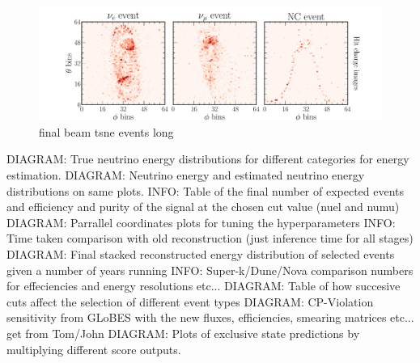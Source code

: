 \begin{figure} %
    \includegraphics[width=\textwidth]{diagrams/6-cvn/chipsnet/final_beam_tsne_events.pdf}
    \caption[final beam tsne events short]
    {final beam tsne events long}
    \label{fig:final_beam_tsne_events}
\end{figure} %

DIAGRAM: True neutrino energy distributions for different categories for energy estimation.
DIAGRAM: Neutrino energy and estimated neutrino energy distributions on same plots.
INFO: Table of the final number of expected events and efficiency and purity of the signal at the chosen cut value (nuel and numu)
DIAGRAM: Parrallel coordinates plots for tuning the hyperparameters
INFO: Time taken comparison with old reconstruction (just inference time for all stages)
DIAGRAM: Final stacked reconstructed energy distribution of selected events given a number of years running
INFO: Super-k/Dune/Nova comparison numbers for effeciencies and energy resolutions etc...
DIAGRAM: Table of how succesive cuts affect the selection of different event types
DIAGRAM: CP-Violation sensitivity from GLoBES with the new fluxes, efficiencies, smearing matrices etc... get from Tom/John
DIAGRAM: Plots of exclusive state predictions by multiplying different score outputs.


